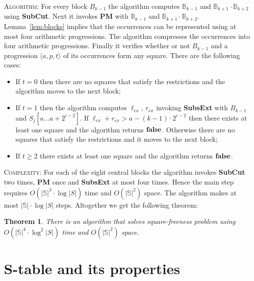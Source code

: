 \documentclass[10pt]{article}
\newtheorem{thm}{Theorem}[section]
\newcommand{\prog}[3]{\langle #1, #2, #3\rangle}
\newcommand{\slp}[1]{\mathbb{#1}}
\begin{document}
\noindent \textsc{Algorithm:} For every block $B_{k-1}$ the algorithm computes $\slp{B}_{k-1}$ and $\slp{B}_{k+1} \cdot \slp{B}_{k+2}$
using \textbf{SubCut}. Next it invokes \textbf{PM} with $\slp{B}_{k-1}$ and $\slp{B}_{k+1} \cdot \slp{B}_{k+2}$. 
Lemma~\ref{lem:blocks} implies that the occurrences can be represented using at most four arithmetic
progressions. The algorithm compresses the occurrences into four arithmetic progressions. Finally it verifies whether or
not $B_{k-1}$ and a progression $\prog{a}{p}{t}$ of its occurrences form any square. There are the following cases:

\begin{itemize}
\item If $t = 0$ then there are no squares that satisfy the restrictions and the algorithm moves to the next block;

\item If $t = 1$ then the algorithm computes $\ell_{ex}$, $r_{ex}$ invoking \textbf{SubsExt} with $B_{k-1}$ and $S_j[a\dots
a + 2^{i-2}]$. If $\ell_{ex} + r_{ex} > a - (k-1)\cdot 2^{i-2}$ then there exists at least one square and the algorithm
returns $\bf{false}$. Otherwise there are no squares that satisfy the restrictions and it moves to the next block;

\item If $t \geq 2$ there exists at least one square and the algorithm returns $\bf{false}$. 
\end{itemize}

\noindent \textsc{Complexity:} For each of the eight central blocks the algorithm invokes \textbf{SubCut} two times, 
\textbf{PM} once and \textbf{SubsExt} at most four times. Hence the main step requires $O(|\slp{S}|^3 \cdot \log |S|)$ time 
and $O(|\slp{S}|^2)$ space. The algorithm makes at most $|\slp{S}| \cdot \log |S|$ steps. Altogether we get the following theorem: 

\begin{thm}
There is an algorithm that solves square-freeness problem using $O(|\slp{S}|^4\cdot \log^2{|S|})$ time and
$O(|\slp{S}|^2)$ space.
\end{thm}

\section{S-table and its properties}
\end{document}
